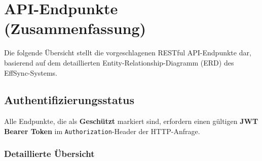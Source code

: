 \chapter{API-Endpunkte (Zusammenfassung)}
\label{ch:api-endpoints}

Die folgende Übersicht stellt die vorgeschlagenen RESTful API-Endpunkte dar, basierend auf dem detaillierten Entity-Relationship-Diagramm (ERD) des EffSync-Systems.

\section{Authentifizierungsstatus}

Alle Endpunkte, die als \textbf{Geschützt} markiert sind, erfordern einen gültigen \textbf{JWT Bearer Token} im \texttt{Authorization}-Header der HTTP-Anfrage.

\subsection{Detaillierte Übersicht}

\centering
\begingroup
\setlength{\tabcolsep}{4pt} %
\small %

